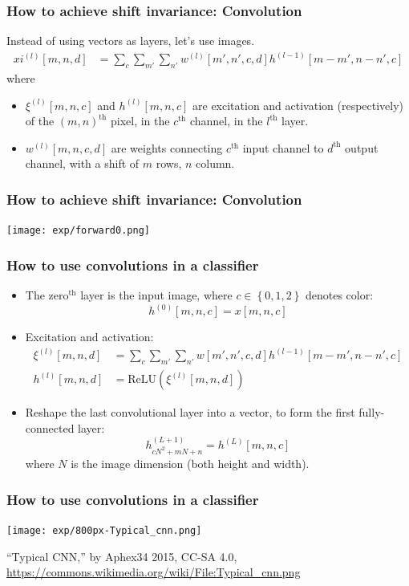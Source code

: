 \documentclass{beamer}
\begin{document}
\begin{frame}
  \frametitle{How to achieve shift invariance: Convolution}

  Instead of using vectors as layers, let's use images.
  \begin{align*}
    xi^{(l)}[m,n,d] &= \sum_c\sum_{m'}\sum_{n'} w^{(l)}[m',n',c,d]h^{(l-1)}[m-m',n-n',c]
  \end{align*}
  where
  \begin{itemize}
  \item $\xi^{(l)}[m,n,c]$ and $h^{(l)}[m,n,c]$ are excitation and
    activation (respectively) of the $(m,n)^{\textrm{th}}$ pixel, in
    the $c^{\textrm{th}}$ channel, in the $l^{\textrm{th}}$ layer.
  \item $w^{(l)}[m,n,c,d]$ are weights connecting $c^{\textrm{th}}$
    input channel to $d^{\textrm{th}}$ output channel, with a shift of
    $m$ rows, $n$ column.
  \end{itemize}
\end{frame}

\begin{frame}
  \frametitle{How to achieve shift invariance: Convolution}

  \centerline{\texttt{[image: exp/forward0.png]}}
\end{frame}

\begin{frame}
  \frametitle{How to use convolutions in a classifier}
  \begin{itemize}
  \item The zero$^{\textrm{th}}$ layer is the input image, where
    $c\in\left\{0,1,2\right\}$ denotes color:
    \[
    h^{(0)}[m,n,c] = x[m,n,c]
    \]
  \item Excitation and activation:
    \begin{align*}
      \xi^{(l)}[m,n,d] &= \sum_c\sum_{m'}\sum_{n'} w[m',n',c,d]h^{(l-1)}[m-m',n-n',c]\\
      h^{(l)}[m,n,d] &= \mbox{ReLU}\left(\xi^{(l)}[m,n,d]\right)
    \end{align*}
  \item Reshape the last convolutional layer into a vector, to form
    the first fully-connected layer:
    \[
    h^{(L+1)}_{cN^2+mN+n} = h^{(L)}[m,n,c]
    \]
    where $N$ is the image dimension  (both height and width).
  \end{itemize}
\end{frame}
      
\begin{frame}
  \frametitle{How to use convolutions in a classifier}

  \centerline{\texttt{[image: exp/800px-Typical\_cnn.png]}}
  \begin{tiny}
    ``Typical CNN,'' by Aphex34 2015, CC-SA 4.0,
    \url{https://commons.wikimedia.org/wiki/File:Typical_cnn.png}
  \end{tiny}
\end{frame}
\end{document}
